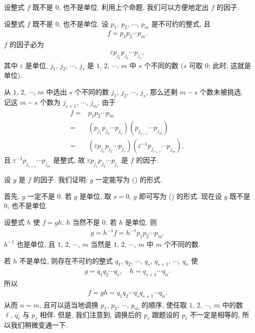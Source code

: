 设整式 $f$ 既不是 $0$, 也不是单位. 利用上个命题, 我们可以方便地定出 $f$ 的因子.

\begin{proposition}
    设整式 $f$ 既不是 $0$, 也不是单位. 设 $p_1$, $p_2$, $\cdots$, $p_m$ 是不可约的整式, 且
    \begin{align*}
        f = p_1 p_2 \cdots p_m.
    \end{align*}
    $f$ 的因子必为
    \begin{align*}
        \varepsilon p_{j_1} p_{j_2} \cdots p_{j_s} \tag*{(\myStar)},
    \end{align*}
    其中 $\varepsilon$ 是单位, $j_1$, $j_2$, $\cdots$, $j_s$ 是 $1$, $2$, $\cdots$, $m$ 中 $s$ 个不同的数 ($s$ 可取 $0$; 此时, 这就是单位).
\end{proposition}

\begin{pf}
    从 $1$, $2$, $\cdots$, $m$ 中选出 $s$ 个不同的数 $j_1$, $j_2$, $\cdots$, $j_s$, 那么还剩 $m-s$ 个数未被挑选. 记这 $m-s$ 个数为 $j_{s+1}$, $\cdots$, $j_m$. 由于
    \begin{align*}
        f
        = {} & p_1 p_2 \cdots p_m                                                                          \\
        = {} & (p_{j_1} p_{j_2} \cdots p_{j_s}) (p_{j_{s+1}} \cdots p_{j_m})                               \\
        = {} & (\varepsilon p_{j_1} p_{j_2} \cdots p_{j_s}) (\varepsilon^{-1} p_{j_{s+1}} \cdots p_{j_m}),
    \end{align*}
    且 $\varepsilon^{-1} p_{j_{s+1}} \cdots p_{j_m}$ 是整式, 故 $\varepsilon p_{j_1} p_{j_2} \cdots p_{j_s}$ 是 $f$ 的因子.

    设 $g$ 是 $f$ 的因子. 我们证明: $g$ 一定能写为 (\myStar) 的形式.

    首先, $g$ 一定不是 $0$. 若 $g$ 是单位, 取 $s = 0$, $g$ 即可写为 (\myStar) 的形式. 现在设 $g$ 既不是 $0$, 也不是单位.

    设整式 $h$ 使 $f = gh$. $h$ 当然不是 $0$. 若 $h$ 是单位, 则
    \begin{align*}
        g = h^{-1} f = h^{-1} p_1 p_2 \cdots p_m.
    \end{align*}
    $h^{-1}$ 也是单位, 且 $1$, $2$, $\cdots$, $m$ 当然是 $1$, $2$, $\cdots$, $m$ 中 $m$ 个不同的数.

    若 $h$ 不是单位, 则存在不可约的整式 $q_1$, $q_2$, $\cdots$, $q_s$, $q_{s+1}$, $\cdots$, $q_n$ 使
    \begin{align*}
        g = q_1 q_2 \cdots q_s, \quad h = q_{s+1} \cdots q_n.
    \end{align*}
    所以
    \begin{align*}
        f = gh = q_1 q_2 \cdots q_s q_{s+1} \cdots q_n.
    \end{align*}
    从而 $n = m$, 且可以适当地调换 $p_1$, $p_2$, $\cdots$, $p_m$ 的顺序, 使任取 $1$, $2$, $\cdots$, $m$ 中的数 $\ell$, $q_\ell$ 与 $p_\ell$ 相伴. 但是, 我们注意到, 调换后的 $p_{\ell}$ 跟题设的 $p_{\ell}$ 不一定是相等的, 所以我们稍微变通一下.


\end{pf}
